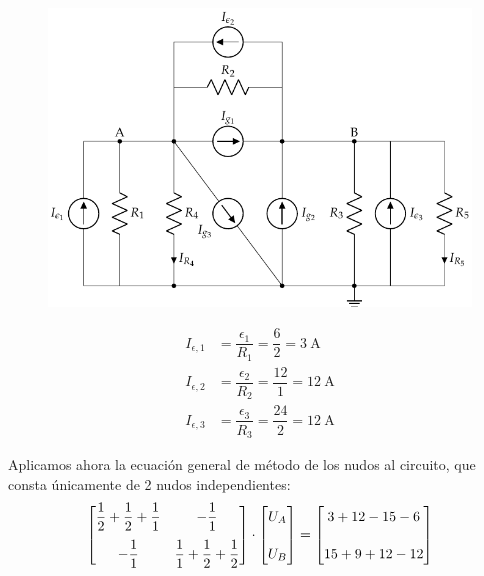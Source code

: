 \begin{example}
          \begin{figure}[H]
            \centering
            \includegraphics[scale=0.9]{../figs/nudos_fuentes2.pdf}
          \end{figure}

          \vspace{-3mm}
          \begin{align*}
            I_{\epsilon,1}&=\dfrac{\epsilon_1}{R_1}=\dfrac{6}{2}=\qty{3}{\ampere}\\
            I_{\epsilon,2}&=\dfrac{\epsilon_2}{R_2}=\dfrac{12}{1}=\qty{12}{\ampere}\\
            I_{\epsilon,3}&=\dfrac{\epsilon_3}{R_3}=\dfrac{24}{2}=\qty{12}{\ampere}
          \end{align*}

          \vspace{2mm} Aplicamos ahora la ecuación general de método
          de los nudos al circuito, que consta únicamente de 2 nudos
          independientes:
          \begin{equation*}
            \begin{bmatrix}
              \dfrac{1}{2}+\dfrac{1}{2}+\dfrac{1}{1} & -\dfrac{1}{1}\\[10pt]
              -\dfrac{1}{1} & \dfrac{1}{1}+\dfrac{1}{2}+\dfrac{1}{2}
            \end{bmatrix}
            \cdot
            \begin{bmatrix}
              \vphantom{\dfrac{1}{1}} U_A\\[10pt]
              \vphantom{\dfrac{1}{1}} U_B
            \end{bmatrix}
            =
            \begin{bmatrix}
              \vphantom{\dfrac{1}{1}} 3+12-15-6\\[10pt]
              \vphantom{\dfrac{1}{1}} 15+9+12-12
            \end{bmatrix}
          \end{equation*}
    

\end{example}
